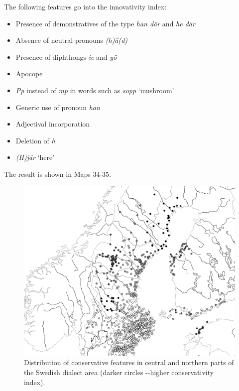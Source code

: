 The following features go into the innovativity index:

\begin{itemize}
\item 

Presence of demonstratives of the type\textit{ han där} and \textit{he där}

\item 

Absence of neutral pronouns \textit{(h)ä(d)}

\item 

Presence of diphthongs \textit{ie} and \textit{yö}

\item 

Apocope

\item 

\textit{Pp} instead of \textit{mp }in words such as \textit{sopp} ‘mushroom’

\item 

Generic use of pronoun \textit{han}

\item 

Adjectival incorporation

\item 

Deletion of \textit{h}

\item 

\textit{(H)jär} ‘here’

\end{itemize}

The result is shown in Maps 34-35. 

\begin{figure}[h]
\includegraphics[height=.5\textheight]{figures/38_DistributionConservativeFeatures}
\caption{Distribution of conservative features in central and northern parts of the Swedish dialect area (darker circles -{}-higher conservativity index). }
\label{map:34}
\end{figure}

